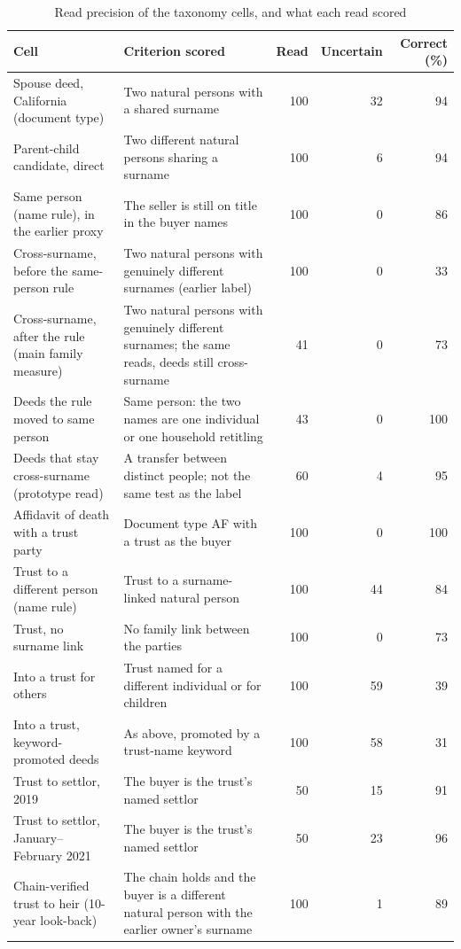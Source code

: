 \begin{table}[!ht]\centering
\caption{Read precision of the taxonomy cells, and what each read scored}
\label{tab:readprec}
{\footnotesize\setlength{\tabcolsep}{3pt}\begin{tabular}{p{4.3cm}p{6.4cm}rrr}\toprule
Cell & Criterion scored & Read & Uncertain & Correct (\%) \\
\midrule
Spouse deed, California (document type) & Two natural persons with a shared surname & 100 & 32 & 94 \\
Parent-child candidate, direct & Two different natural persons sharing a surname & 100 & 6 & 94 \\
Same person (name rule), in the earlier proxy & The seller is still on title in the buyer names & 100 & 0 & 86 \\
Cross-surname, before the same-person rule & Two natural persons with genuinely different surnames (earlier label) & 100 & 0 & 33 \\
Cross-surname, after the rule (main family measure) & Two natural persons with genuinely different surnames; the same reads, deeds still cross-surname & 41 & 0 & 73 \\
Deeds the rule moved to same person & Same person: the two names are one individual or one household retitling & 43 & 0 & 100 \\
Deeds that stay cross-surname (prototype read) & A transfer between distinct people; not the same test as the label & 60 & 4 & 95 \\
Affidavit of death with a trust party & Document type AF with a trust as the buyer & 100 & 0 & 100 \\
Trust to a different person (name rule) & Trust to a surname-linked natural person & 100 & 44 & 84 \\
Trust, no surname link & No family link between the parties & 100 & 0 & 73 \\
Into a trust for others & Trust named for a different individual or for children & 100 & 59 & 39 \\
Into a trust, keyword-promoted deeds & As above, promoted by a trust-name keyword & 100 & 58 & 31 \\
Trust to settlor, 2019 & The buyer is the trust's named settlor & 50 & 15 & 91 \\
Trust to settlor, January--February 2021 & The buyer is the trust's named settlor & 50 & 23 & 96 \\
Chain-verified trust to heir (10-year look-back) & The chain holds and the buyer is a different natural person with the earlier owner's surname & 100 & 1 & 89 \\

\end{tabular}}
\end{table}
